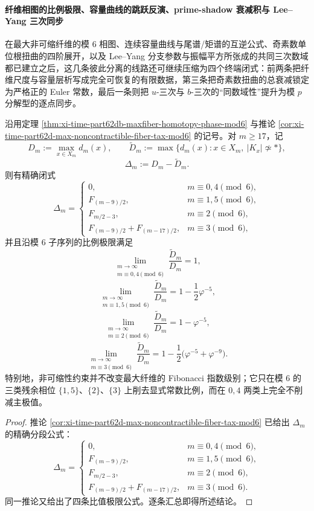 \paragraph{纤维相图的比例极限、容量曲线的跳跃反演、prime-shadow 衰减积与 Lee--Yang 三次同步}
在最大非可缩纤维的模 \(6\) 相图、连续容量曲线与尾谱/矩谱的互逆公式、奇素数单位根扭曲的四阶展开，以及 Lee--Yang 分支参数与振幅平方所张成的共同三次数域都已建立之后，这几条彼此分离的线路还可继续压缩为四个终端闭式：前两条把纤维尺度与容量层析写成完全可恢复的有限数据，第三条把奇素数扭曲的总衰减锁定为严格正的 Euler 常数，最后一条则把 \(u\)-三次与 \(b\)-三次的“同数域性”提升为模 \(p\) 分解型的逐点同步。

\begin{theorem}\label{thm:xi-time-part62df-maxfiber-gap-ratio-limit}
沿用定理 \ref{thm:xi-time-part62db-maxfiber-homotopy-phase-mod6} 与推论 \ref{cor:xi-time-part62d-max-noncontractible-fiber-tax-mod6} 的记号。对 \(m\ge 17\)，记
\[
D_m:=\max_{x\in X_m}d_m(x),
\qquad
\widetilde D_m:=\max\{d_m(x):x\in X_m,\ |K_x|\not\simeq *\},
\]
\[
\Delta_m:=D_m-\widetilde D_m.
\]
则有精确闭式
\[
\Delta_m=
\begin{cases}
0,& m\equiv 0,4\pmod 6,\\[2mm]
F_{(m-9)/2},& m\equiv 1,5\pmod 6,\\[2mm]
F_{m/2-3},& m\equiv 2\pmod 6,\\[2mm]
F_{(m-9)/2}+F_{(m-17)/2},& m\equiv 3\pmod 6,
\end{cases}
\]
并且沿模 \(6\) 子序列的比例极限满足
\[
\lim_{\substack{m\to\infty\\ m\equiv 0,4\!\!\!\!\pmod 6}}
\frac{\widetilde D_m}{D_m}=1,
\]
\[
\lim_{\substack{m\to\infty\\ m\equiv 1,5\!\!\!\!\pmod 6}}
\frac{\widetilde D_m}{D_m}
=
1-\frac{1}{2}\varphi^{-5},
\]
\[
\lim_{\substack{m\to\infty\\ m\equiv 2\!\!\!\!\pmod 6}}
\frac{\widetilde D_m}{D_m}
=
1-\varphi^{-5},
\]
\[
\lim_{\substack{m\to\infty\\ m\equiv 3\!\!\!\!\pmod 6}}
\frac{\widetilde D_m}{D_m}
=
1-\frac{1}{2}\bigl(\varphi^{-5}+\varphi^{-9}\bigr).
\]
特别地，非可缩性约束并不改变最大纤维的 Fibonacci 指数级别；它只在模 \(6\) 的三类残余相位 \(\{1,5\}\)、\(\{2\}\)、\(\{3\}\) 上削去显式常数比例，而在 \(0,4\) 两类上完全不削减主极值。
\end{theorem}
\begin{proof}
推论 \ref{cor:xi-time-part62d-max-noncontractible-fiber-tax-mod6} 已给出 \(\Delta_m\) 的精确分段公式：
\[
\Delta_m=
\begin{cases}
0,& m\equiv 0,4\pmod 6,\\[1mm]
F_{(m-9)/2},& m\equiv 1,5\pmod 6,\\[1mm]
F_{m/2-3},& m\equiv 2\pmod 6,\\[1mm]
F_{(m-9)/2}+F_{(m-17)/2},& m\equiv 3\pmod 6.
\end{cases}
\]
同一推论又给出了四条比值极限公式。逐条汇总即得所述结论。
\end{proof}

